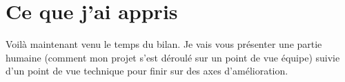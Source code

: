 \chapter{Ce que j'ai appris}

Voilà maintenant venu le temps du bilan. Je vais vous présenter une partie humaine (comment mon projet s'est déroulé sur un point de vue équipe) suivie d'un point de vue technique pour finir sur des axes d'amélioration.




